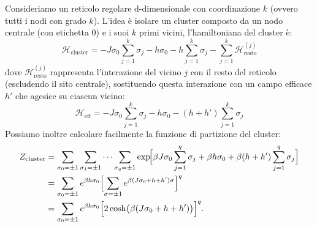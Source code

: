 Consideriamo un reticolo regolare d-dimensionale con coordinazione $k$ (ovvero tutti i nodi con grado $k$). L'idea è isolare un cluster composto da un nodo centrale (con etichetta 0) e i suoi $k$ primi vicini, l'hamiltoniana del cluster è:
\begin{equation}
    \mathcal{H}_{\text{cluster}}=-J \sigma_0 \sum_{j=1}^{k} \sigma_j -h\sigma_0 -h \sum_{j=1}^{k}\sigma_j - \sum_{j=1}^{k}\mathcal{H}^{(j)}_{\text{resto}}
\end{equation}
dove $\mathcal{H}^{(j)}_{\text{resto}}$ rappresenta l'interazione del vicino $j$ con il resto del reticolo (escludendo il sito centrale), sostituendo questa interazione con un campo efficace $h'$ che agesice su ciascun vicino:
\begin{equation}
    \mathcal{H}_{\text{eff}}=-J \sigma_0 \sum_{j=1}^{k}\sigma_j - h \sigma_0 - (h+h')\sum_{j=1}^{k}\sigma_j
\end{equation}
Possiamo inoltre calcolare facilmente la funzione di partizione del cluster:
\begin{align}
Z_{\text{cluster}} 
&= \sum_{\sigma_0=\pm1}\sum_{\sigma_1=\pm1}\cdots\sum_{\sigma_q=\pm1}
   \exp\!\Bigl[\beta J\sigma_0\sum_{j=1}^{q}\sigma_j 
   + \beta h\sigma_0 + \beta(h+h')\sum_{j=1}^{q}\sigma_j\Bigr] \\
&= \sum_{\sigma_0=\pm1} e^{\beta h\sigma_0}
   \Bigl[\sum_{\sigma=\pm1} e^{\beta(J\sigma_0+h+h')\sigma}\Bigr]^{q} \\
&= \sum_{\sigma_0=\pm1} e^{\beta h\sigma_0}
   \Bigl[2\cosh\bigl(\beta(J\sigma_0+h+h')\bigr)\Bigr]^{q}.
\end{align}

